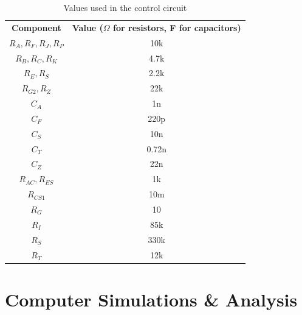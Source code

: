 \documentclass[12pt]{article}
\begin{document}
    \begin{table}[H]
    \centering
        \begin{tabular}{cc}
        \textbf{Component}   & \textbf{Value ($\Omega$ for resistors, F for capacitors)} \\
        $R_A, R_F, R_J, R_P$ & 10k                                                       \\
        $R_B, R_C, R_K$      & 4.7k                                                      \\
        $R_E, R_S$           & 2.2k                                                      \\
        $R_{G2}, R_Z$        & 22k                                                       \\
        $C_A$                & 1n                                                        \\
        $C_F$                & 220p                                                      \\
        $C_S$                & 10n                                                       \\
        $C_T$                & 0.72n                                                     \\
        $C_Z$                & 22n                                                       \\
        $R_{AC}, R_{ES}$     & 1k                                                        \\
        $R_{CS1}$            & 10m                                                       \\
        $R_G$                & 10                                                        \\
        $R_I$                & 85k                                                       \\
        $R_S$                & 330k                                                      \\
        $R_T$                & 12k                                                      
        \end{tabular}
    \caption{Values used in the control circuit}
    \end{table}

\section{Computer Simulations \& Analysis}
\end{document}

